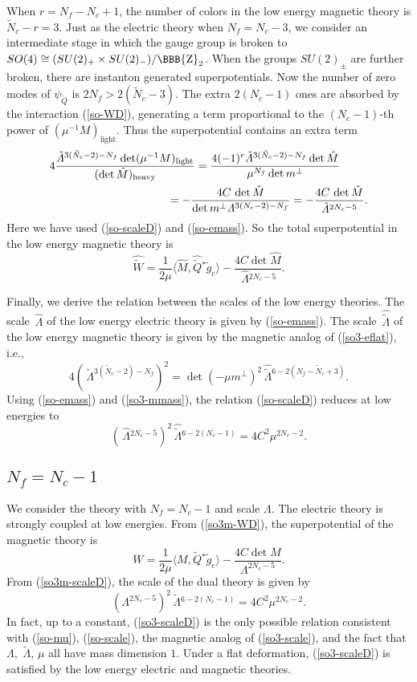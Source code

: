 \documentclass[lecture]{qft-l}
\newcommand{\Lam}{\varLambda}
\newcommand{\ZZ}{{\mbox{\BBB{Z}}}}
\newcommand{\bra}{\langle}
\newcommand{\ket}{\rangle}
\newcommand{\inv}[1]{\frac{1}{#1}}
\newcommand{\hLam}{\,\hat{\!\Lam}{}}
\newcommand{\tLam}{\,\tilde{\!\Lam}{}}
\newcommand{\htLam}{\,\hat{\tilde{\!\Lam}}{}}
\newcommand{\tM}{\tilde{M}{}}
\newcommand{\tQ}{\tilde{Q}{}}
\newcommand{\tN}{\tilde{N}_c}
\newcommand{\htQ}{\hat{\tilde{Q}}{}}
\newcommand{\hM}{\hat{M}{}}
\def\Subhead#1{\subsection*{#1}}
\begin{document}
When $r=N_f-N_c+1$, the number of colors in the low energy magnetic theory is
$\tN-r=3$.
Just as the electric theory when $N_f=N_c-3$, we consider an intermediate
stage in which the gauge group is broken to
$SO(4)\cong(SU(2)_+\times SU(2)_-)/\ZZ_2$.
When the groups $SU(2)_\pm$ are further broken, there are instanton
generated superpotentials.
Now the number of zero modes of $\psi_{\tQ}$ is $2N_f>2(\tN-3)$.
The extra $2(N_c-1)$ ones are absorbed by the interaction (\ref{so-WD}),
generating a term proportional to the $(N_c-1)$-th power of 
$(\mu^{-1}M)_\mathrm{light}$.
Thus the superpotential contains an extra term
\begin{align}
4\frac{\tLam^{3(\tN-2)-N_f}\det(\mu^{-1}M)_{\mathrm{light}}}
{(\det\tM)_{\mathrm{heavy}}}
&=\frac{4(-1)^r\tLam^{3(\tN-2)-N_f}\det\hM}{\mu^{N_f}\det m^\perp}\\
&\null\kern-25pt
=-\frac{4C\,\det\hM}{\det m^\perp\Lam^{3(N_c-2)-N_f}}
=-\frac{4C\,\det\hM}{\hLam^{2N_c-5}}.\nonumber
\end{align}
Here we have used (\ref{so-scaleD}) and (\ref{so-emass}).
So the total superpotential in the low energy magnetic theory is
	\begin{equation}\label{so3m-WD}
\hat{\tilde{W}}=\inv{2\mu}\bra\hM,\htQ^*\tilde{g}_c\ket
-\frac{4C\det\hM}{\hLam^{2N_c-5}}.
	\end{equation}

Finally, we derive the relation between the scales of the low energy theories.
The scale $\hLam$ of the low energy electric theory is given by 
(\ref{so-emass}).
The scale $\htLam$ of the low energy magnetic theory
is given by the magnetic analog of (\ref{so3-eflat}), i.e.,
	\begin{equation}\label{so3-mmass}
4(\tLam^{3(\tN-2)-N_f})^2=\det(-\mu m^\perp)^2\htLam^{6-2(N_f-\tN+3)}.
	\end{equation}
Using (\ref{so-emass}) and (\ref{so3-mmass}), the relation (\ref{so-scaleD})
reduces at low energies to
	\begin{equation}\label{so3m-scaleD}
(\hLam^{2N_c-5})^2\htLam^{6-2(N_c-1)}=4C^2\mu^{2N_c-2}.
	\end{equation}


\Subhead{{\boldmath $N_f=N_c-1$}}

We consider the theory with $N_f=N_c-1$ and scale $\Lam$.
The electric theory is strongly coupled at low energies.
{}From (\ref{so3m-WD}), the superpotential of the magnetic theory is
	\begin{equation}\label{so3-WD}
W=\inv{2\mu}\bra M,\tQ^*\tilde{g}_c\ket-\frac{4C\det M}{\Lam^{2N_c-5}}.
	\end{equation}
{}From (\ref{so3m-scaleD}), the scale of the dual theory is given by
	\begin{equation}\label{so3-scaleD}
(\Lam^{2N_c-5})^2\tLam^{6-2(N_c-1)}=4C^2\mu^{2N_c-2}.
	\end{equation}
In fact, up to a constant, (\ref{so3-scaleD}) is the only possible relation
consistent with (\ref{so-mu}), (\ref{so-scale}), the magnetic analog of 
(\ref{so3-scale}), and the fact that $\Lam$, $\tLam$, $\mu$ all have
mass dimension $1$.
Under a flat deformation, (\ref{so3-scaleD}) is satisfied by the low
energy electric and magnetic theories.
\end{document}
